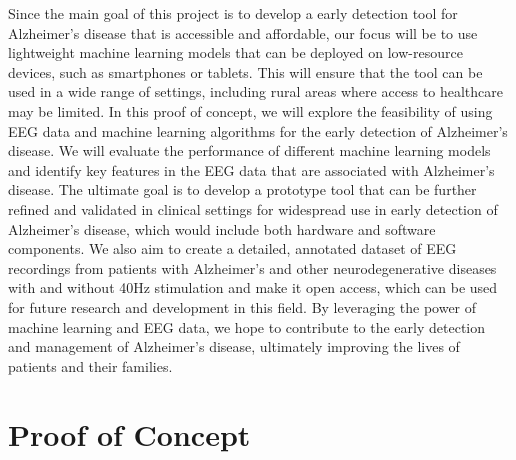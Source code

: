 \documentclass[openany]{book}
\begin{document}
    Since the main goal of this project is to develop a early detection tool for Alzheimer's disease that is accessible and affordable, our focus will be to use lightweight machine learning models that can be deployed on low-resource devices, such as smartphones or tablets. This will ensure that the tool can be used in a wide range of settings, including rural areas where access to healthcare may be limited. In this proof of concept, we will explore the feasibility of using EEG data and machine learning algorithms for the early detection of Alzheimer's disease. We will evaluate the performance of different machine learning models and identify key features in the EEG data that are associated with Alzheimer's disease. The ultimate goal is to develop a prototype tool that can be further refined and validated in clinical settings for widespread use in early detection of Alzheimer's disease, which would include both hardware and software components. We also aim to create a detailed, annotated dataset of EEG recordings from patients with Alzheimer's and other neurodegenerative diseases with and without 40Hz stimulation and make it open access, which can be used for future research and development in this field. By leveraging the power of machine learning and EEG data, we hope to contribute to the early detection and management of Alzheimer's disease, ultimately improving the lives of patients and their families.


\chapter{Proof of Concept}
\end{document}

